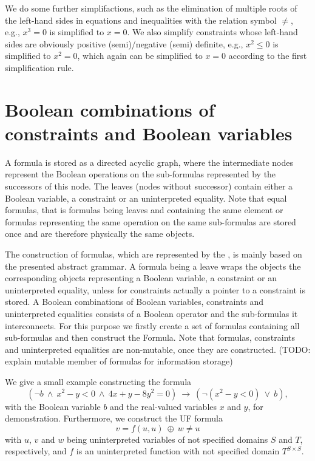 We do some further simplifactions, such as the elimination of multiple roots of the left-hand sides in equations and inequalities with the relation symbol $\neq$, e.g., $x^3=0$ is simplified to $x=0$. We also simplify constraints whose left-hand sides are obviously positive (semi)/negative (semi) definite, e.g., $x^2\leq 0$ is simplified to $x^2=0$, which again can be simplified to $x=0$ according to the first simplification rule.

\section{Boolean combinations of constraints and Boolean variables}
A formula is stored as a directed acyclic graph, where the intermediate nodes represent the Boolean operations on the sub-formulas represented by the successors of this node. The leaves (nodes without successor) contain either a Boolean variable, a constraint or an uninterpreted equality. Note that equal formulas, that is formulas being leaves and containing the same element or formulas representing the same operation on the same sub-formulas are stored once and are therefore physically the same objects.

The construction of formulas, which are represented by the \formulaClass, is mainly based on the presented abstract grammar. A formula being a leave wraps the objects the corresponding objects representing a Boolean variable, a constraint or an uninterpreted equality, unless for constraints actually a pointer to a constraint is stored. A Boolean combinations of Boolean variables, constraints and uninterpreted equalities consists of a Boolean operator and the sub-formulas it interconnects. For this purpose we firstly create a set of formulas containing all sub-formulas and then construct the Formula. Note that formulas, constraints and uninterpreted equalities are non-mutable, once they are constructed. (TODO: explain mutable member of formulas for information storage) 

We give a small example constructing the formula \[(\neg b\ \land\ x^2-y<0\ \land\ 4x+y-8y^2=0 )\ \rightarrow\ (\neg(x^2-y<0)\ \lor\ b ),\] with the Boolean variable $b$ and the real-valued variables $x$ and $y$, for demonstration. Furthermore, we construct the UF formula
\[v = f(u,u)\ \oplus\ w \neq u\]
with $u$, $v$ and $w$ being uninterpreted variables of not specified domains $S$ and $T$, respectively,
and $f$ is an uninterpreted function with not specified domain $T^{S\times S}$.

